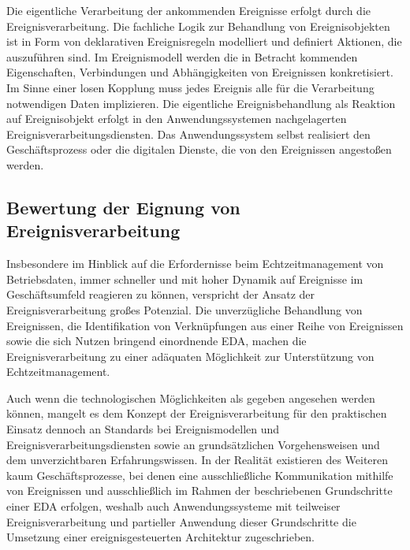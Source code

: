 Die eigentliche Verarbeitung der ankommenden Ereignisse erfolgt durch die Ereignisverarbeitung. 
Die fachliche Logik zur Behandlung von Ereignisobjekten ist in Form von deklarativen Ereignisregeln modelliert und definiert Aktionen, die auszuführen sind. 
Im Ereignismodell werden die in Betracht kommenden Eigenschaften, Verbindungen und Abhängigkeiten von Ereignissen konkretisiert. Im Sinne einer losen Kopplung muss jedes Ereignis alle für die Verarbeitung notwendigen Daten implizieren.
\cite{Bruns.2010}
Die eigentliche Ereignisbehandlung als Reaktion auf Ereignisobjekt erfolgt in den Anwendungssystemen nachgelagerten Ereignisverarbeitungsdiensten. 
Das Anwendungssystem selbst realisiert den Geschäftsprozess oder die digitalen Dienste, die von den Ereignissen angestoßen werden. 
\cite{Muhl.2006}

\subsection{Bewertung der Eignung von Ereignisverarbeitung}
Insbesondere im Hinblick auf die Erfordernisse beim Echtzeitmanagement von Betriebsdaten, immer schneller und mit hoher Dynamik auf Ereignisse im Geschäftsumfeld reagieren zu können, verspricht der Ansatz der Ereignisverarbeitung großes Potenzial.
Die unverzügliche Behandlung von Ereignissen, die Identifikation von Verknüpfungen aus einer Reihe von Ereignissen sowie die sich Nutzen bringend einordnende \ac{EDA}, machen die Ereignisverarbeitung zu einer adäquaten Möglichkeit zur Unterstützung von Echtzeitmanagement.
\cite{Vidackovic.2010} 

Auch wenn die technologischen Möglichkeiten als gegeben angesehen werden können, mangelt es dem Konzept der Ereignisverarbeitung für den praktischen Einsatz dennoch an Standards bei Ereignismodellen und Ereignisverarbeitungsdiensten sowie an grundsätzlichen Vorgehensweisen und dem unverzichtbaren Erfahrungswissen. 
\cite{Etzion.2011}
In der Realität existieren des Weiteren kaum Geschäftsprozesse, bei denen eine ausschließliche Kommunikation mithilfe von Ereignissen und ausschließlich im Rahmen der beschriebenen Grundschritte einer \ac{EDA} erfolgen, weshalb auch Anwendungssysteme mit teilweiser Ereignisverarbeitung und partieller Anwendung dieser Grundschritte die Umsetzung einer ereignisgesteuerten Architektur zugeschrieben.
\cite{Etzion.2011}


